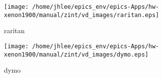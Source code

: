 \noindent
\vspace{1.4cm}
\begin{minipage}{.2\textwidth}
\begin{center}
\texttt{[image: /home/jhlee/epics\_env/epics-Apps/hw-xenon1900/manual/zint/vd\_images/raritan.eps]}
\end{center}
\end{minipage}
\begin{minipage}{.7\textwidth}
raritan
\end{minipage}


\noindent
\vspace{1.4cm}
\begin{minipage}{.2\textwidth}
\begin{center}
\texttt{[image: /home/jhlee/epics\_env/epics-Apps/hw-xenon1900/manual/zint/vd\_images/dymo.eps]}
\end{center}
\end{minipage}
\begin{minipage}{.7\textwidth}
dymo
\end{minipage}



